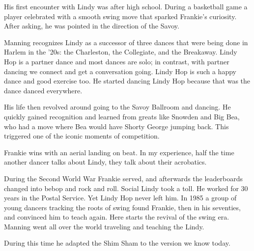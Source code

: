 \documentclass[12pt]{article}
\begin{document}
His first encounter with Lindy was after high school. During a basketball game a player celebrated with a smooth swing move that sparked Frankie’s curiosity. After asking, he was pointed in the direction of the Savoy.

Manning recognizes Lindy as a successor of three dances that were being done in Harlem in the ’20s: the Charleston, the Collegiate, and the Breakaway. Lindy Hop is a partner dance and most dances are solo; in contrast, with partner dancing we connect and get a conversation going. Lindy Hop is such a happy dance and good exercise too. He started dancing Lindy Hop because that was the dance danced everywhere.

His life then revolved around going to the Savoy Ballroom and dancing. He quickly gained recognition and learned from greats like Snowden and Big Bea, who had a move where Bea would have Shorty George jumping back. This triggered one of the iconic moments of competition.

Frankie wins with an aerial landing on beat. In my experience, half the time another dancer talks about Lindy, they talk about their acrobatics.

During the Second World War Frankie served, and afterwards the leaderboards changed into bebop and rock and roll. Social Lindy took a toll. He worked for 30 years in the Postal Service. Yet Lindy Hop never left him. In 1985 a group of young dancers tracking the roots of swing found Frankie, then in his seventies, and convinced him to teach again. Here starts the revival of the swing era. Manning went all over the world traveling and teaching the Lindy.

During this time he adapted the Shim Sham to the version we know today.
\end{document}
